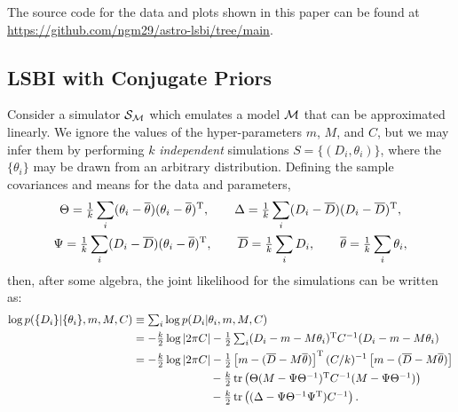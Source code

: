 \documentclass[%
 reprint,
 amsmath,amssymb,
 aps,
]{revtex4-2}
\begin{document}
The source code for the data and plots shown in this paper can be found at \href{https://github.com/ngm29/astro-lsbi/tree/main}{https://github.com/ngm29/astro-lsbi/tree/main}.

\vfill

\clearpage





\appendix

\begin{widetext}


\section{LSBI with Conjugate Priors} \label{ap:A}

Consider a simulator $\mathcal{S}_{\mathcal{M}}$ which emulates a model $\mathcal{M}$ that can be approximated linearly. We ignore the values of the hyper-parameters $m$, $M$, and $C$, but we may infer them by performing $k$ \emph{independent} simulations $S = \{(D_i, \theta_i)\}$, where the $\{\theta_i\}$ may be drawn from an arbitrary distribution. Defining the sample covariances and means for the data and parameters,
\begin{gather}
    \Theta 	= \tfrac{1}{k}\sum_i (\theta_i-\overline{\theta})(\theta_i-\overline{\theta})^{\mathrm{T}}, \qquad
    \Delta 	= \tfrac{1}{k}\sum_i ( D_i-\overline{ D})( D_i-\overline{D})^{\mathrm{T}}, \\
    \Psi 	= \tfrac{1}{k}\sum_i ( D_i-\overline{D})(\theta_i-\overline{\theta})^{\mathrm{T}}, \qquad
    \overline{D} 	= \tfrac{1}{k}\sum_i  D_i, \qquad
    \overline{\theta} = \tfrac{1}{k}\sum_i \theta_i, 
\end{gather}
then, after some algebra, the joint likelihood for the simulations can be written as:
\begin{align*}
	\log p(\{D_i\}|\{\theta_i\},m,M,C) 
		&\equiv \textstyle\sum_i \log p(D_i|\theta_i,m,M,C)								\\
		& = -\tfrac{k}{2}\log|2\pi C|
			-\tfrac{1}{2}\textstyle\sum_i ( D_i - m - M\theta_i)^{\mathrm{T}} C^{-1}( D_i - m - M\theta_i) \\
		& = -\tfrac{k}{2}\log|2\pi C|
			-\tfrac{1}{2}\left[  m- (\overline{D}-M\overline{\theta})  \right]^{\mathrm{T}} (C/k)^{-1}\left[  m- (\overline{D}-M\overline{\theta}) \right] 	\\
		&\qquad\qquad\qquad\quad\! \textstyle 
			-\frac{k}{2} \tr\left(  \Theta (M-\Psi\Theta^{-1})^{\mathrm{T}} C^{-1}(M-\Psi\Theta^{-1}) \right)\\
		&\qquad\qquad\qquad\quad\! \textstyle  
			- \frac{k}{2} \tr\left( (\Delta -  \Psi \Theta^{-1}\Psi^{\mathrm{T}})C^{-1} \right)  .
\end{align*}


\end{widetext}
\end{document}
